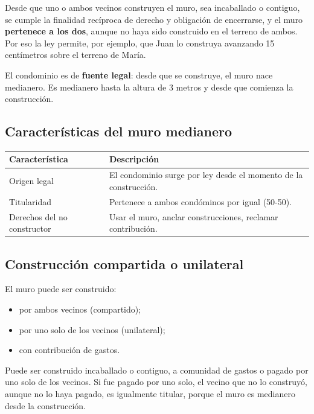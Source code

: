 \documentclass[12pt,oneside]{book}
\begin{document}
Desde que uno o ambos vecinos construyen el muro, sea incaballado o contiguo, se cumple la finalidad recíproca de derecho y obligación de encerrarse, y el muro \textbf{pertenece a los dos}, aunque no haya sido construido en el terreno de ambos. Por eso la ley permite, por ejemplo, que Juan lo construya avanzando 15 centímetros sobre el terreno de María.

\begin{important}
El condominio es de \textbf{fuente legal}: desde que se construye, el muro nace medianero. Es medianero hasta la altura de 3 metros y desde que comienza la construcción.
\end{important}

\subsection{Características del muro medianero}

\begin{table}[H]
\centering
\begin{tabularx}{\textwidth}{>{\raggedright\arraybackslash}p{} >{\raggedright\arraybackslash}X}
\toprule
\textbf{Característica} & \textbf{Descripción} \\
\midrule
Origen legal & El condominio surge por ley desde el momento de la construcción. \\
Titularidad & Pertenece a ambos condóminos por igual (50-50). \\
Derechos del no constructor & Usar el muro, anclar construcciones, reclamar contribución. \\
\bottomrule
\end{tabularx}
\end{table}

\subsection{Construcción compartida o unilateral}

El muro puede ser construido:

\begin{itemize}
\item por ambos vecinos (compartido);
\item por uno solo de los vecinos (unilateral);
\item con contribución de gastos.
\end{itemize}

Puede ser construido incaballado o contiguo, a comunidad de gastos o pagado por uno solo de los vecinos. %
Si fue pagado por uno solo, el vecino que no lo construyó, aunque no lo haya pagado, es igualmente titular, porque el muro es medianero desde la construcción.
\end{document}
